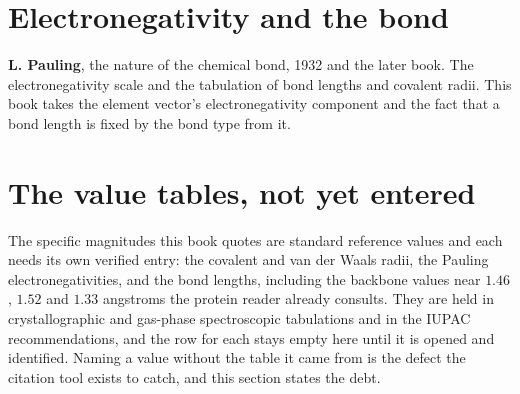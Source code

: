 \section*{Electronegativity and the bond}

\textbf{L. Pauling}, the nature of the chemical bond, 1932 and the later book. The electronegativity
scale and the tabulation of bond lengths and covalent radii. This book takes the element vector's
electronegativity component and the fact that a bond length is fixed by the bond type from it.

\section*{The value tables, not yet entered}

The specific magnitudes this book quotes are standard reference values and each needs its own
verified entry: the covalent and van der Waals radii, the Pauling electronegativities, and the bond
lengths, including the backbone values near $1.46$, $1.52$ and $1.33$ angstroms the protein reader
already consults. They are held in crystallographic and gas-phase spectroscopic tabulations and in
the IUPAC recommendations, and the row for each stays empty here until it is opened and identified.
Naming a value without the table it came from is the defect the citation tool exists to catch, and
this section states the debt.
